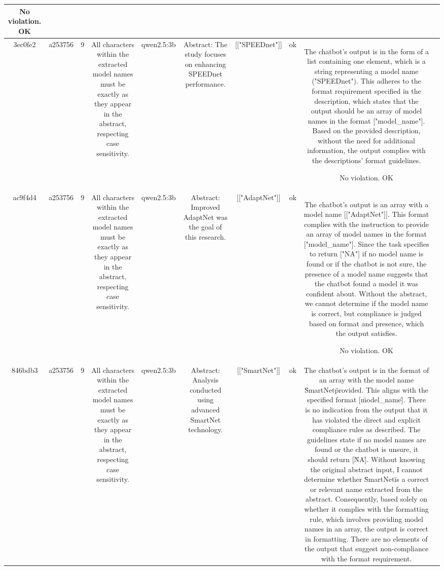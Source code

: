 \begin{table}[h!]
\begin{tabular}{|c|c|c|c|c|c|c|c|c|c|}
No violation.
OK & \\
\hline
3ec0fe2 & a253756 & 9 & All characters within the extracted model names must be exactly as they appear in the abstract, respecting case sensitivity. & qwen2.5:3b & Abstract: The study focuses on enhancing SPEEDnet performance. & [["SPEEDnet"]] & ok & The chatbot's output is in the form of a list containing one element, which is a string representing a model name ("SPEEDnet"). This adheres to the format requirement specified in the description, which states that the output should be an array of model names in the format ["model_name"]. Based on the provided description, without the need for additional information, the output complies with the descriptions' format guidelines.

No violation.
OK & \\
\hline
ac9f4d4 & a253756 & 9 & All characters within the extracted model names must be exactly as they appear in the abstract, respecting case sensitivity. & qwen2.5:3b & Abstract: Improved AdaptNet was the goal of this research. & [["AdaptNet"]] & ok & The chatbot's output is an array with a model name [["AdaptNet"]]. This format complies with the instruction to provide an array of model names in the format ["model_name"]. Since the task specifies to return ["NA"] if no model name is found or if the chatbot is not sure, the presence of a model name suggests that the chatbot found a model it was confident about. Without the abstract, we cannot determine if the model name is correct, but compliance is judged based on format and presence, which the output satisfies.

No violation.
OK & \\
\hline
846bdb3 & a253756 & 9 & All characters within the extracted model names must be exactly as they appear in the abstract, respecting case sensitivity. & qwen2.5:3b & Abstract: Analysis conducted using advanced SmartNet technology. & [["SmartNet"]] & ok & The chatbot's output is in the format of an array with the model name \"SmartNet\" provided. This aligns with the specified format [\"model_name\"]. There is no indication from the output that it has violated the direct and explicit compliance rules as described. The guidelines state if no model names are found or the chatbot is unsure, it should return [\"NA\"]. Without knowing the original abstract input, I cannot determine whether \"SmartNet\" is a correct or relevant name extracted from the abstract. Consequently, based solely on whether it complies with the formatting rule, which involves providing model names in an array, the output is correct in formatting. There are no elements of the output that suggest non-compliance with the format requirement.


\end{tabular}
\end{table}
